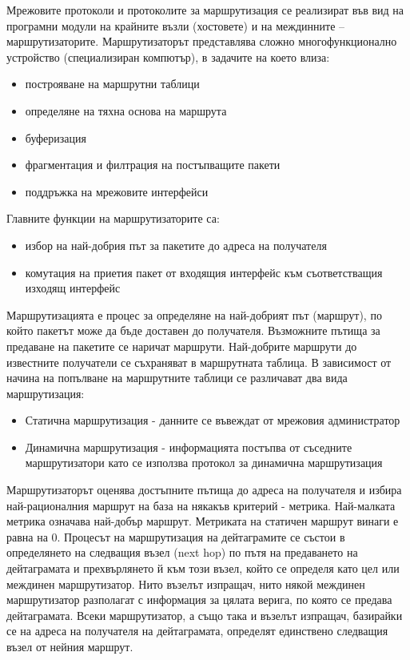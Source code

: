 \documentclass{article}
\begin{document}
Мрежовите протоколи и протоколите за маршрутизация се реализират във вид на програмни модули на крайните възли (хостовете) и на междинните – маршрутизаторите.
Маршрутизаторът представлява сложно многофункционално устройство (специализиран компютър), в задачите на което влиза:
\begin{itemize}
    \item построяване на маршрутни таблици
    \item определяне на тяхна основа на маршрута
    \item буферизация
    \item фрагментация и филтрация на постъпващите пакети
    \item поддръжка на мрежовите интерфейси
\end{itemize}
Главните функции на маршрутизаторите са:
\begin{itemize}
    \item избор на най-добрия път за пакетите до адреса на получателя
    \item комутация на приетия пакет от входящия интерфейс към съответстващия изходящ интерфейс
\end{itemize}
Маршрутизацията е процес за определяне на най-добрият път (маршрут), по който пакетът може да бъде доставен до получателя.
Възможните пътища за предаване на пакетите се наричат маршрути. Най-добрите маршрути до известните получатели се съхраняват в
маршрутната таблица. В зависимост от начина на попълване на маршрутните таблици се различават два вида маршрутизация:
\begin{itemize}
    \item Статична маршрутизация - данните се въвеждат от мрежовия администратор
    \item Динамична маршрутизация - информацията постъпва от съседните маршрутизатори като се използва протокол за динамична маршрутизация
\end{itemize}
Маршрутизаторът оценява достъпните пътища до адреса на получателя и избира най-рационалния маршрут на база на някакъв критерий - метрика.
Най-малката метрика означава най-добър маршрут. Метриката на статичен маршрут винаги е равна на 0.
Процесът на маршрутизация на дейтаграмите се състои в определянето на следващия възел (next hop) по пътя на предаването на
дейтаграмата и прехвърлянето й към този възел, който се определя като цел или междинен маршрутизатор. Нито възелът изпращач, нито
някой междинен маршрутизатор разполагат с информация за цялата верига, по която се предава дейтаграмата. Всеки маршрутизатор,
а също така и възелът изпращач, базирайки се на адреса на получателя на дейтаграмата, определят единствено следващия възел от нейния маршрут.
\end{document}
